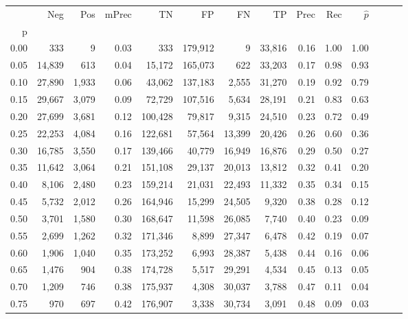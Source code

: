 \begin{tabular}{rrrrrrrrrrrrrr}
\toprule
{} &     Neg &    Pos & mPrec &       TN &       FP &      FN &      TP &  Prec &   Rec & $\hat{p}$ \\
p    &         &        &       &          &          &         &         &       &       &           \\
\midrule
0.00 &     333 &      9 &  0.03 &      333 &  179,912 &       9 &  33,816 &  0.16 &  1.00 &      1.00 \\
0.05 &  14,839 &    613 &  0.04 &   15,172 &  165,073 &     622 &  33,203 &  0.17 &  0.98 &      0.93 \\
0.10 &  27,890 &  1,933 &  0.06 &   43,062 &  137,183 &   2,555 &  31,270 &  0.19 &  0.92 &      0.79 \\
0.15 &  29,667 &  3,079 &  0.09 &   72,729 &  107,516 &   5,634 &  28,191 &  0.21 &  0.83 &      0.63 \\
0.20 &  27,699 &  3,681 &  0.12 &  100,428 &   79,817 &   9,315 &  24,510 &  0.23 &  0.72 &      0.49 \\
0.25 &  22,253 &  4,084 &  0.16 &  122,681 &   57,564 &  13,399 &  20,426 &  0.26 &  0.60 &      0.36 \\
0.30 &  16,785 &  3,550 &  0.17 &  139,466 &   40,779 &  16,949 &  16,876 &  0.29 &  0.50 &      0.27 \\
0.35 &  11,642 &  3,064 &  0.21 &  151,108 &   29,137 &  20,013 &  13,812 &  0.32 &  0.41 &      0.20 \\
0.40 &   8,106 &  2,480 &  0.23 &  159,214 &   21,031 &  22,493 &  11,332 &  0.35 &  0.34 &      0.15 \\
0.45 &   5,732 &  2,012 &  0.26 &  164,946 &   15,299 &  24,505 &   9,320 &  0.38 &  0.28 &      0.12 \\
0.50 &   3,701 &  1,580 &  0.30 &  168,647 &   11,598 &  26,085 &   7,740 &  0.40 &  0.23 &      0.09 \\
0.55 &   2,699 &  1,262 &  0.32 &  171,346 &    8,899 &  27,347 &   6,478 &  0.42 &  0.19 &      0.07 \\
0.60 &   1,906 &  1,040 &  0.35 &  173,252 &    6,993 &  28,387 &   5,438 &  0.44 &  0.16 &      0.06 \\
0.65 &   1,476 &    904 &  0.38 &  174,728 &    5,517 &  29,291 &   4,534 &  0.45 &  0.13 &      0.05 \\
0.70 &   1,209 &    746 &  0.38 &  175,937 &    4,308 &  30,037 &   3,788 &  0.47 &  0.11 &      0.04 \\
0.75 &     970 &    697 &  0.42 &  176,907 &    3,338 &  30,734 &   3,091 &  0.48 &  0.09 &      0.03 \\

\end{tabular}
